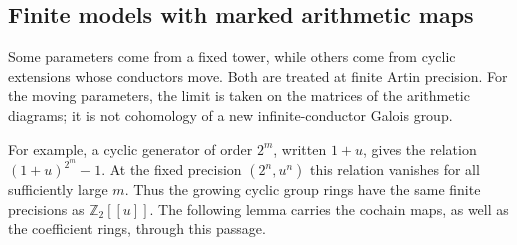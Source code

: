 \subsection{Finite models with marked arithmetic maps}

Some parameters come from a fixed tower, while others come from cyclic
extensions whose conductors move. Both are treated at finite Artin
precision. For the moving parameters, the limit is taken on the matrices
of the arithmetic diagrams; it is not cohomology of a new infinite-conductor
Galois group.

For example, a cyclic generator of order \(2^m\), written \(1+u\), gives
the relation \((1+u)^{2^m}-1\). At the fixed precision
\((2^n,u^n)\) this relation vanishes for all sufficiently large \(m\).
Thus the growing cyclic group rings have the same finite precisions as
\(\mathbb Z_2[[u]]\). The following lemma carries the cochain maps, as
well as the coefficient rings, through this passage.

